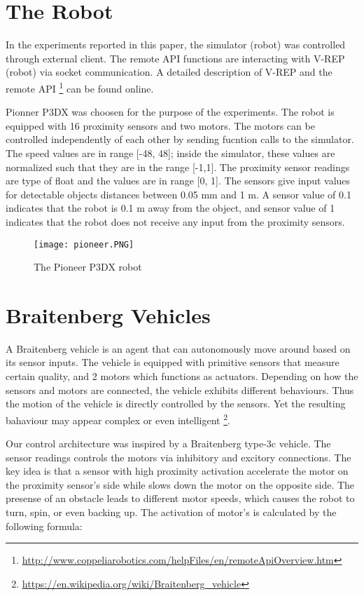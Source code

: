 \documentclass[format=acmsmall, review=false, screen=true]{acmart}
\begin{document}
\section{The Robot}

In the experiments reported in this paper, the simulator (robot) was controlled through external client. The remote API functions are interacting with V-REP (robot) via socket communication. A detailed description of V-REP and the remote API \footnote{\url{http://www.coppeliarobotics.com/helpFiles/en/remoteApiOverview.htm}} can be found online.

Pionner P3DX was choosen for the purpose of the experiments. The robot is equipped with 16 proximity sensors and two motors. The motors can be controlled independently of each other by sending fucntion calls to the simulator. The speed values are in range [-48, 48]; inside the simulator, these values are normalized such that they are in the range [-1,1]. The proximity sensor readings are type of float and the values are in range [0, 1]. The sensors give input values for detectable objects distances between 0.05 mm and 1 m. A sensor value of 0.1 indicates that the robot is 0.1 m away from the object, and sensor value of 1 indicates that the robot does not receive any input from the proximity sensors.

\begin{figure}[H]
  \texttt{[image: pioneer.PNG]}
  \caption{The Pioneer P3DX robot}
  \label{fig:pioneer-robot}
\end{figure}

\section{Braitenberg Vehicles}

A Braitenberg vehicle is an agent that can autonomously move around based on its sensor inputs. The vehicle is equipped with primitive sensors that measure certain quality, and 2 motors which functions as actuators. Depending on how the sensors and motors are connected, the vehicle exhibits different behaviours. Thus the motion of the vehicle is directly controlled by the sensors. Yet the resulting bahaviour may appear complex or even intelligent \footnote{\url{https://en.wikipedia.org/wiki/Braitenberg_vehicle}}.

Our control architecture was inspired by a Braitenberg type-3c vehicle. The sensor readings controls the motors via inhibitory and excitory connections. The key idea is that a sensor with high proximity activation accelerate the motor on the proximity sensor's side while slows down the motor on the opposite side. The presense of an obstacle leads to different motor speeds, which causes the robot to turn, spin, or even backing up. The activation of motor's is calculated by the following formula:
\end{document}
